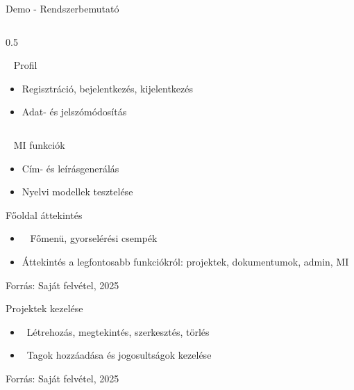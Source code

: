 \documentclass[aspectratio=169, 11pt]{beamer}
\begin{document}
\begin{frame}{Demo - Rendszerbemutató}
\begin{columns}[T]
\begin{column}{0.5\textwidth}
      \begin{block}{\faUserCircle~ Profil}
        \begin{itemize}
          \item Regisztráció, bejelentkezés, kijelentkezés
          \item Adat- és jelszómódosítás
        \end{itemize}
      \end{block}
    \end{column}
  \end{columns}
\vspace{-0.5em}
  \begin{center}
      \begin{minipage}{0.5\textwidth}
        \begin{block}{\faRobot~ MI funkciók}
          \begin{itemize}
            \item Cím- és leírásgenerálás
            \item Nyelvi modellek tesztelése
          \end{itemize}
        \end{block}
      \end{minipage}
    \end{center}
\end{frame}

\begin{frame}{Főoldal áttekintés}
  \begin{center}
  \end{center}
  \begin{itemize}
    \item \faHome~ Főmenü, gyorselérési csempék
    \item Áttekintés a legfontosabb funkciókról: projektek, dokumentumok, admin, MI
  \end{itemize}
  \begin{center}
    \scriptsize Forrás: Saját felvétel, 2025
  \end{center}
\end{frame}

\begin{frame}{Projektek kezelése}
    \begin{center}
    \end{center}
    \begin{itemize}
      \item \faPlusCircle~Létrehozás, megtekintés, szerkesztés, törlés
      \item \faUsers~Tagok hozzáadása és jogosultságok kezelése
    \end{itemize}
    \begin{center}
        \scriptsize Forrás: Saját felvétel, 2025
    \end{center}
\end{frame}
\end{document}

